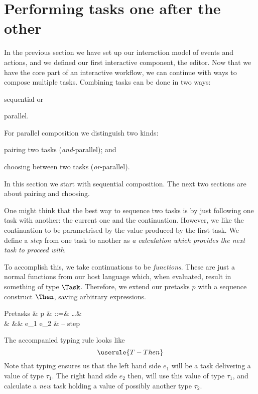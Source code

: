 
\section{Performing tasks one after the other}

In the previous section we have set up our interaction model of events and actions,
and we defined our first interactive component, the editor.
Now that we have the core part of an interactive workflow,
we can continue with ways to compose multiple tasks.
Combining tasks can be done in two ways:
\begin{enumerate*}
  \item sequential or
  \item parallel.
\end{enumerate*}
For parallel composition we distinguish two kinds:
\begin{enumerate*}[(a)]
  \item pairing two tasks (\emph{and}-parallel); and
  \item choosing between two tasks (\emph{or}-parallel).
\end{enumerate*}
In this section we start with sequential composition.
The next two sections are about pairing and choosing.

One might think that the best way to sequence two tasks is by just following one task with another:
the current one and the continuation.
However, we like the continuation to be parametrised by the value produced by the first task.
We define a \emph{step} from one task to another as \emph{a calculation which provides the next task to proceed with}.

To accomplish this,
we take continuations to be \emph{functions}.
These are just a normal functions from our host language which,
when evaluated, result in something of type $\Task$.
Therefore,
we extend our pretasks $p$ with a sequence construct $\Then$,
saving arbitrary expressions.
\begin{grammar}
  Pretasks
    & p & ::=& \ldots        & \\
    &   &\mid& e_1 \Then e_2 & – step \\
\end{grammar}
The accompanied typing rule looks like
\begin{equation*}
  \userule{T-Then}
\end{equation*}
Note that typing ensures us that the left hand side $e_1$ will be a task delivering a value of type $\tau_1$.
The right hand side $e_2$ then, will use this value of type $\tau_1$,
and calculate a \emph{new} task holding a value of possibly another type $\tau_2$.

